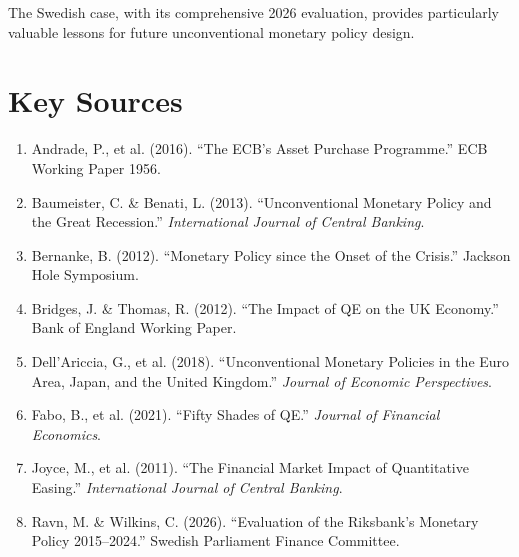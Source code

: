 \documentclass[11pt,a4paper]{article}
\begin{document}
The Swedish case, with its comprehensive 2026 evaluation, provides particularly valuable lessons for future unconventional monetary policy design.

\newpage
\section*{Key Sources}

\begin{enumerate}
    \item Andrade, P., et al. (2016). ``The ECB's Asset Purchase Programme.'' ECB Working Paper 1956.

    \item Baumeister, C. \& Benati, L. (2013). ``Unconventional Monetary Policy and the Great Recession.'' \textit{International Journal of Central Banking}.

    \item Bernanke, B. (2012). ``Monetary Policy since the Onset of the Crisis.'' Jackson Hole Symposium.

    \item Bridges, J. \& Thomas, R. (2012). ``The Impact of QE on the UK Economy.'' Bank of England Working Paper.

    \item Dell'Ariccia, G., et al. (2018). ``Unconventional Monetary Policies in the Euro Area, Japan, and the United Kingdom.'' \textit{Journal of Economic Perspectives}.

    \item Fabo, B., et al. (2021). ``Fifty Shades of QE.'' \textit{Journal of Financial Economics}.

    \item Joyce, M., et al. (2011). ``The Financial Market Impact of Quantitative Easing.'' \textit{International Journal of Central Banking}.

    \item Ravn, M. \& Wilkins, C. (2026). ``Evaluation of the Riksbank's Monetary Policy 2015--2024.'' Swedish Parliament Finance Committee.
\end{enumerate}
\end{document}
